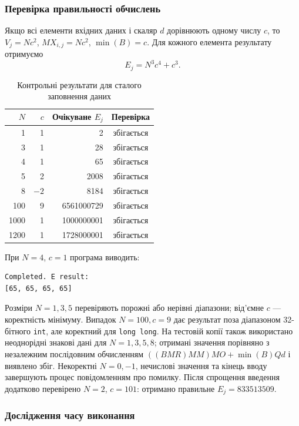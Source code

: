 \documentclass[12pt,a4paper]{article}
\begin{document}
\subsubsection*{Перевірка правильності обчислень}

Якщо всі елементи вхідних даних і скаляр $d$ дорівнюють одному числу $c$,
то $V_j=Nc^2$, $MX_{i,j}=Nc^2$, $\min(B)=c$. Для кожного елемента
результату отримуємо
\begin{equation}
 E_j=N^3c^4+c^3.
\end{equation}

\begin{table}[H]
\centering\renewcommand{\arraystretch}{1.15}
\begin{tabular}{|r|r|r|c|}\hline
$N$ & $c$ & Очікуване $E_j$ & Перевірка\\\hline
1 & 1 & 2 & збігається\\\hline
3 & 1 & 28 & збігається\\\hline
4 & 1 & 65 & збігається\\\hline
5 & 2 & 2008 & збігається\\\hline
8 & $-2$ & 8184 & збігається\\\hline
100 & 9 & 6561000729 & збігається\\\hline
1000 & 1 & 1000000001 & збігається\\\hline
1200 & 1 & 1728000001 & збігається\\\hline
\end{tabular}
\caption{Контрольні результати для сталого заповнення даних}
\end{table}

При $N=4$, $c=1$ програма виводить:
\begin{verbatim}
Completed. E result:
[65, 65, 65, 65]
\end{verbatim}

Розміри $N=1,3,5$ перевіряють порожні або нерівні діапазони;
від’ємне $c$ --- коректність мінімуму. Випадок $N=100,c=9$ дає результат
поза діапазоном 32-бітного \texttt{int}, але коректний для
\texttt{long long}. На тестовій копії також використано неоднорідні
знакові дані для $N=1,3,5,8$; отримані значення порівняно з незалежним
послідовним обчисленням $((BMR)MM)MO+\min(B)Qd$ і виявлено збіг.
Некоректні $N=0,-1$, нечислові значення та кінець вводу завершують
процес повідомленням про помилку. Після спрощення введення додатково
перевірено $N=2$, $c=101$: отримано правильне $E_j=833513509$.

\subsubsection*{Дослідження часу виконання}
\end{document}
